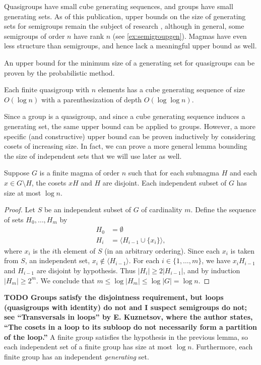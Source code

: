 \documentclass{article}
\newcommand{\todo}[1]{\textbf{TODO #1}}
\newcommand{\gen}[1]{\langle #1 \rangle}
\begin{document}
Quasigroups have small cube generating sequences, and groups have small generating sets.
As of this publication, upper bounds on the size of generating sets for semigroups remain the subject of research \autocite{gray14}, although in general, some semigroups of order $n$ have rank $n$ (see \autoref{ex:semigroupgen}).
Magmas have even less structure than semigroups, and hence lack a meaningful upper bound as well.

An upper bound for the minimum size of a generating set for quasigroups can be proven by the probabilistic method.

\begin{lemma}\label{lem:small}
  Each finite quasigroup with $n$ elements has a cube generating sequence of size $O(\log n)$ with a parenthesization of depth $O(\log \log n)$.
\end{lemma}

Since a group is a quasigroup, and since a cube generating sequence induces a generating set, the same upper bound can be applied to groups.
However, a more specific (and constructive) upper bound can be proven inductively by considering cosets of increasing size.
In fact, we can prove a more general lemma bounding the size of independent sets that we will use later as well.

\begin{lemma}\label{lem:magind}
  Suppose $G$ is a finite magma of order $n$ such that for each submagma $H$ and each $x \in G \setminus H$, the cosets $xH$ and $H$ are disjoint.
  Each independent subset of $G$ has size at most $\log n$.
\end{lemma}
\begin{proof}
  Let $S$ be an independent subset of $G$ of cardinality $m$.
  Define the sequence of sets $H_0, \dotsc, H_m$ by
  \begin{align*}
    H_0 & = \emptyset \\
    H_i & = \gen{H_{i - 1} \cup \{x_i\}},
  \end{align*}
  where $x_i$ is the $i$th element of $S$ (in an arbitrary ordering).
  Since each $x_i$ is taken from $S$, an independent set, $x_i \notin \gen{H_{i - 1}}$.
  For each $i \in \{1, \dotsc, m\}$, we have $x_i H_{i - 1}$ and $H_{i - 1}$ are disjoint by hypothesis.
  Thus $|H_i| \geq 2 |H_{i - 1}|$, and by induction $|H_m| \geq 2^m$.
  We conclude that $m \leq \log |H_m| \leq \log |G| = \log n$.
\end{proof}

\todo{Groups satisfy the disjointness requirement, but loops (quasigroups with identity) do not and I suspect semigroups do not; see ``Transversals in loops'' by E. Kuznetsov, where the author states, ``The cosets in a loop to its subloop do not necessarily form a partition of the loop.''}
A finite group satisfies the hypothesis in the previous lemma, so each independent set of a finite group has size at most $\log n$.
Furthermore, each finite group has an independent \emph{generating} set.
\end{document}
